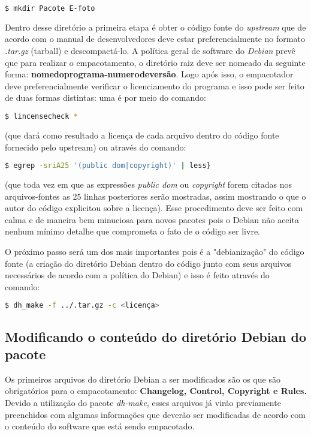 \begin{lstlisting}[language=bash]
	$ mkdir Pacote E-foto 
\end{lstlisting} 

Dentro desse diretório a primeira etapa é obter o código fonte do \textit{upstream} que de acordo com o manual de desenvolvedores deve estar preferencialmente no formato \textit{.tar.gz} (tarball) e descompactá-lo. A política geral de software do \textit{Debian} prevê que para realizar o empacotamento, o diretório raiz deve ser nomeado da seguinte forma: \textbf{nomedoprograma-numerodeversão}. Logo após isso, o empacotador deve preferencialmente verificar o licenciamento do programa e isso pode ser feito de duas formas distintas: uma é por meio do comando:

\begin{lstlisting}[language=bash]
	$ lincensecheck *
\end{lstlisting}

(que dará como resultado a licença de cada arquivo dentro do código fonte fornecido pelo upstream) ou através do comando: 

\begin{lstlisting}[language=bash]
	$ egrep -sriA25 '(public dom|copyright)' | less} 
\end{lstlisting}

(que toda vez em que as expressões \textit{public dom} ou \textit{copyright} forem citadas nos arquivos-fontes as 25 linhas posteriores serão mostradas, assim mostrando o que o autor do código explicitou sobre a licença). Esse procedimento deve ser feito com calma e de maneira bem minuciosa para novos pacotes pois o Debian não aceita nenhum mínimo detalhe que comprometa o fato de o código ser livre.

O próximo passo será um dos mais importantes pois é a "debianização" do código fonte (a criação do diretório Debian dentro do código junto com seus arquivos necessários de acordo com a política do Debian) e isso é feito através do comando:

\begin{lstlisting}[language=bash]
	$ dh_make -f ../.tar.gz -c <licença> 
\end{lstlisting} 

\subsection{Modificando o conteúdo do diretório Debian do pacote}

Os primeiros arquivos do diretório Debian a ser modificados são os que são obrigatórios para o empacotamento:\textbf{ Changelog, Control, Copyright e Rules.} Devido a utilização do pacote \textit{dh-make}, esses arquivos já virão previamente preenchidos com algumas informações que deverão ser modificadas de acordo com o conteúdo do software que está sendo empacotado.


